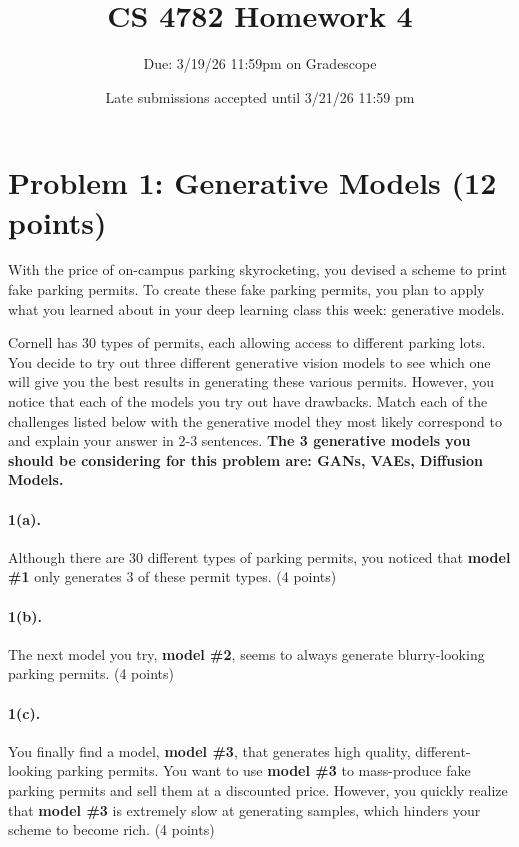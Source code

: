 \documentclass{article}
\title{CS 4782 Homework 4\vspace{-10pt}}
\author{Due: 3/19/26 11:59pm on Gradescope}
\date{Late submissions accepted until 3/21/26 11:59 pm}
\begin{document}
\maketitle

\section*{Problem 1: Generative Models (12 points)}

With the price of on-campus parking skyrocketing, you devised a scheme to print fake parking permits. To create these fake parking permits, you plan to apply what you learned about in your deep learning class this week: generative models.

Cornell has 30 types of permits, each allowing access to different parking lots. You decide to try out three different generative vision models to see which one will give you the best results in generating these various permits. However, you notice that each of the models you try out have drawbacks. Match each of the challenges listed below with the generative model they most likely correspond to and explain your answer in 2-3 sentences. \textbf{The 3 generative models you should be considering for this problem are: GANs, VAEs, Diffusion Models.}


\paragraph{1(a).} Although there are 30 different types of parking permits, you noticed that \textbf{model \#1} only generates 3 of these permit types. (4 points)\\


\paragraph{1(b).} The next model you try, \textbf{model \#2}, seems to always generate blurry-looking parking permits. (4 points)\\


\paragraph{1(c).} You finally find a model, \textbf{model \#3}, that generates high quality, different-looking parking permits. You want to use \textbf{model \#3} to mass-produce fake parking permits and sell them at a discounted price. However, you quickly realize that \textbf{model \#3} is extremely slow at generating samples, which hinders your scheme to become rich. (4 points)\\
\end{document}
